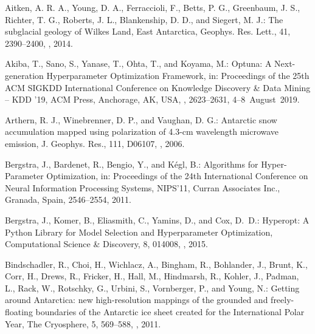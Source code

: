 \documentclass[tc, noline]{copernicus}
\begin{document}





\begin{thebibliography}{95}

Aitken, A. R. A., Young, D. A., Ferraccioli, F., Betts, P. G., Greenbaum, J. S., Richter, T. G., Roberts, J. L., Blankenship, D. D., and Siegert, M. J.: The subglacial geology of Wilkes Land, East Antarctica, Geophys. Res. Lett., 41, 2390--2400, , 2014.

Akiba, T., Sano, S., Yanase, T., Ohta, T., and Koyama, M.: Optuna: A Next-generation Hyperparameter Optimization Framework, in: Proceedings of the 25th ACM SIGKDD International Conference on Knowledge Discovery \& Data Mining  -- KDD '19, ACM Press, Anchorage, AK, USA, , 2623--2631, 4--8~August~2019.

Arthern, R. J., Winebrenner, D. P., and Vaughan, D. G.: Antarctic snow accumulation mapped using polarization of 4.3-cm wavelength microwave emission, J. Geophys. Res., 111, D06107, , 2006.


Bergstra, J., Bardenet, R., Bengio, Y., and K{\'e}gl, B.:
Algorithms for Hyper-Parameter Optimization, in: Proceedings of the 24th International Conference on Neural Information Processing Systems, NIPS'11, Curran Associates Inc., Granada, Spain, 2546--2554, 2011.

Bergstra, J., Komer, B., Eliasmith, C., Yamins, D., and Cox, D.~D.:
Hyperopt: A Python Library for Model Selection and Hyperparameter Optimization,
Computational Science \& Discovery,
8, 014008, , 2015.

Bindschadler, R., Choi, H., Wichlacz, A., Bingham, R., Bohlander, J., Brunt, K., Corr, H., Drews, R., Fricker, H., Hall, M., Hindmarsh, R., Kohler, J., Padman, L., Rack, W., Rotschky, G., Urbini, S., Vornberger, P., and Young, N.: Getting around Antarctica: new high-resolution mappings of the grounded and freely-floating boundaries of the Antarctic ice sheet created for the International Polar Year, The Cryosphere, 5, 569--588, , 2011.


\end{thebibliography}
\end{document}
